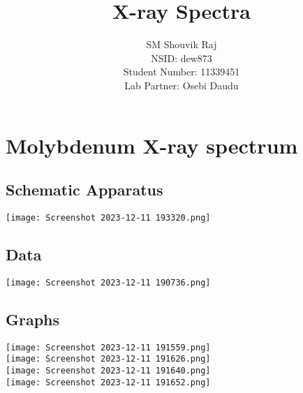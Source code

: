 \documentclass{article}
\title{X-ray Spectra}
\author{SM Shouvik Raj
\\NSID: dew873
\\Student Number: 11339451
\\ Lab Partner: Osebi Daudu}\\
\begin{document}
\maketitle
\newpage
\section{Molybdenum X-ray spectrum}
\subsection{Schematic Apparatus}
\texttt{[image: Screenshot 2023-12-11 193320.png]}
\subsection{Data}
\texttt{[image: Screenshot 2023-12-11 190736.png]}
\subsection{Graphs}
\texttt{[image: Screenshot 2023-12-11 191559.png]}\\
\texttt{[image: Screenshot 2023-12-11 191626.png]}\\
\texttt{[image: Screenshot 2023-12-11 191640.png]}\\
\texttt{[image: Screenshot 2023-12-11 191652.png]}\\
\end{document}
